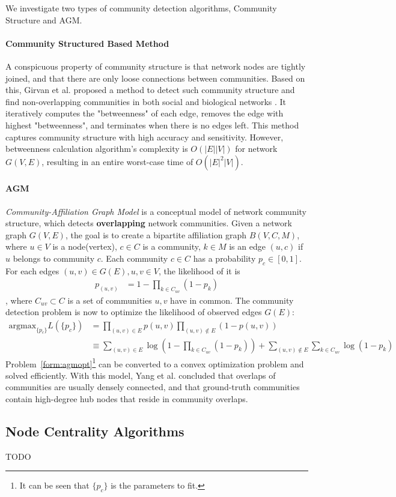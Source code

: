 \par We investigate two types of community detection algorithms,
Community Structure\citep{girvan2002community}  and AGM\citep{yang2012structure}.

\paragraph{Community Structured Based Method} A conspicuous property of 
community structure is that network nodes are tightly joined, and that
there are only loose connections between communities. Based on this,
Girvan et al. proposed a method to detect such community structure and
find non-overlapping communities in both social and biological networks
\citep{girvan2002community}. It iteratively computes the "betweenness"\citep{freeman1977graph}
of each edge, removes the edge with highest "betweenness", and terminates
when there is no edges left. This method captures community structure
with high accuracy and sensitivity. However, betweenness calculation algorithm's 
complexity  is $O(|E| |V|)$ for network $G(V,E)$, resulting in an
entire worst-case time of $O(|E|^2 |V|)$.


\paragraph{AGM} \textit{Community-Affiliation Graph Model}\citep{yang2012structure}
is a conceptual model of network community structure, which detects 
\textbf{overlapping} network communities. Given a network graph $G(V,E)$, the
goal is to create a bipartite affiliation graph $B(V, C, M)$, where
$u\in V$ is a node(vertex), $c\in C$ is a community, 
$k\in M$ is an edge $(u,c)$ if $u$ belongs to community $c$. Each
community $c\in C$ has a probability $p_c\in [0,1]$.
For each edges $(u,v)\in G(E), u,v \in V$, the likelihood of it is 
\begin{align}
    p_(u,v) &= 1- \prod_{k\in C_{uv}}(1-p_k)
\end{align},
where $C_{uv}\subset C$ is a set of communities $u,v$ have in common.
The community detection problem is now to optimize the likelihood of 
observed edges $G(E)$: 
\begin{align} \label{form:agmopt}
    \text{argmax}_{\{p_c\}} L(\{p_c\}) &= \prod_{(u,v)\in E} p(u,v) 
        \prod_{(u,v)\notin E} (1 - p(u,v))\\
    &\equiv \sum_{(u,v)\in E}\log{(1 - \prod_{k\in C_{uv}} (1-p_k))} + 
        \sum_{(u,v)\notin E}\sum_{k\in C_{uv}} \log{(1-p_k)}
\end{align}
Problem~\ref{form:agmopt}\footnote{It can be seen that $\{p_c\}$ is the parameters to fit.}
can be converted to a convex optimization 
problem and solved efficiently\citep{yang2012structure}. 
With this model, Yang et al.\citep{yang2012structure} concluded that overlaps of communities are
usually densely connected, and that ground-truth communities contain
high-degree hub nodes that reside in community overlaps.

\subsection{Node Centrality Algorithms}
\par TODO
